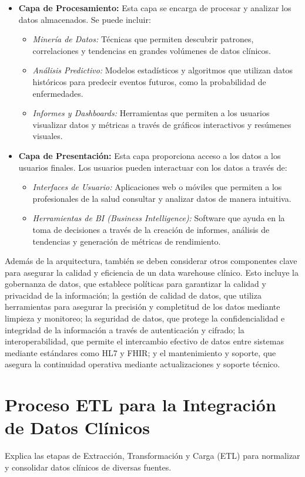 \documentclass[12pt, a4paper, twoside]{article}
\begin{document}
\begin{itemize}
		\item \textbf{Capa de Procesamiento:} Esta capa se encarga de procesar y analizar los datos almacenados. Se puede incluir:
		\begin{itemize}
			\item \textit{Minería de Datos:} Técnicas que permiten descubrir patrones, correlaciones y tendencias en grandes volúmenes de datos clínicos.
			\item \textit{Análisis Predictivo:} Modelos estadísticos y algoritmos que utilizan datos históricos para predecir eventos futuros, como la probabilidad de enfermedades.
			\item \textit{Informes y Dashboards:} Herramientas que permiten a los usuarios visualizar datos y métricas a través de gráficos interactivos y resúmenes visuales.
		\end{itemize}
		
		\item \textbf{Capa de Presentación:} Esta capa proporciona acceso a los datos a los usuarios finales. Los usuarios pueden interactuar con los datos a través de:
		\begin{itemize}
			\item \textit{Interfaces de Usuario:} Aplicaciones web o móviles que permiten a los profesionales de la salud consultar y analizar datos de manera intuitiva.
			\item \textit{Herramientas de BI (Business Intelligence):} Software que ayuda en la toma de decisiones a través de la creación de informes, análisis de tendencias y generación de métricas de rendimiento.
		\end{itemize}
	\end{itemize}
	
	
	Además de la arquitectura, también se deben considerar otros componentes clave para asegurar la calidad y eficiencia de un data warehouse clínico. Esto incluye la gobernanza de datos, que establece políticas para garantizar la calidad y privacidad de la información; la gestión de calidad de datos, que utiliza herramientas para asegurar la precisión y completitud de los datos mediante limpieza y monitoreo; la seguridad de datos, que protege la confidencialidad e integridad de la información a través de autenticación y cifrado; la interoperabilidad, que permite el intercambio efectivo de datos entre sistemas mediante estándares como HL7 y FHIR; y el mantenimiento y soporte, que asegura la continuidad operativa mediante actualizaciones y soporte técnico.
	
	
	\section{Proceso ETL para la Integración de Datos Clínicos}
	Explica las etapas de Extracción, Transformación y Carga (ETL) para normalizar y consolidar datos clínicos de diversas fuentes.
	
\end{document}
